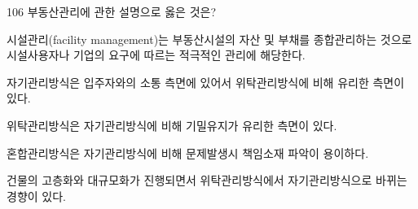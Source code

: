 \begin{question}{106}
부동산관리에 관한 설명으로 옳은 것은?
\begin{choices}
  \item 시설관리(facility management)는 부동산시설의 자산 및 부채를 종합관리하는 것으로 시설사용자나 기업의 요구에 따르는 적극적인 관리에 해당한다.
  \item 자기관리방식은 입주자와의 소통 측면에 있어서 위탁관리방식에 비해 유리한 측면이 있다.
  \item 위탁관리방식은 자기관리방식에 비해 기밀유지가 유리한 측면이 있다.
  \item 혼합관리방식은 자기관리방식에 비해 문제발생시 책임소재 파악이 용이하다.
  \item 건물의 고층화와 대규모화가 진행되면서 위탁관리방식에서 자기관리방식으로 바뀌는 경향이 있다.
\end{choices}
\end{question}
